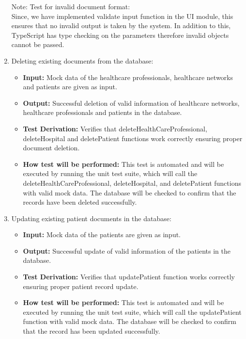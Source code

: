 \documentclass[12pt, titlepage]{article}
\begin{document}
\begin{enumerate}
    Note: Test for invalid document format: \\ 
    Since, we have implemented validate input function in the UI module, this ensures that no invalid output is taken by the system. In addition to this, TypeScript has type checking on the parameters therefore invalid objects cannot be passed.

  \item Deleting existing documents from the database:
    \begin{itemize}
      \item \textbf{Input:} Mock data of the healthcare professionals, healthcare networks and patients are given as input.  
      \item \textbf{Output:} Successful deletion of valid information of healthcare networks, healthcare professionals and patients in the database. 
      \item \textbf{Test Derivation:} Verifies that deleteHealthCareProfessional, deleteHospital and deletePatient functions work correctly ensuring proper document deletion.
      \item \textbf{How test will be performed:} This test is automated and will be executed by running the unit test suite, which will call the deleteHealthCareProfessional, deleteHospital, and deletePatient functions with valid mock data. The database will be checked to confirm that the records have been deleted successfully.
    \end{itemize}

  \item Updating existing patient documents in the database:
    \begin{itemize}
      \item \textbf{Input:} Mock data of the patients are given as input.  
      \item \textbf{Output:} Successful update of valid information of the patients in the database. 
      \item \textbf{Test Derivation:} Verifies that updatePatient function works correctly ensuring proper patient record update.
      \item \textbf{How test will be performed:} This test is automated and will be executed by running the unit test suite, which will call the updatePatient function with valid mock data. The database will be checked to confirm that the record has been updated successfully.
    \end{itemize}


\end{enumerate}
\end{document}
